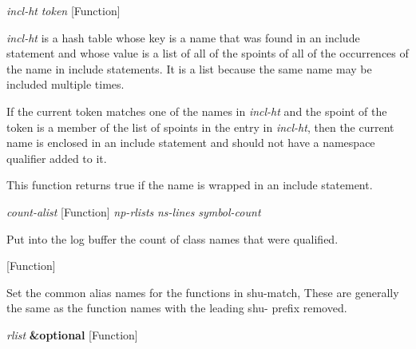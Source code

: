 \vspace{1em}
\noindent
{}
\usebox{\funcname}\emph{incl-ht} \emph{token}
 \hfill [Function]
\hspace*{\wd\funcname}

\begin{doc-string}
\emph{incl-ht} is a hash table whose key is a name that was found in an include
statement and whose value is a list of all of the spoints of all of the
occurrences of the name in include statements.  It is a list because the same
name may be included multiple times.

If the current token matches one of the names in \emph{incl-ht} and the spoint of the
token is a member of the list of spoints in the entry in \emph{incl-ht}, then the
current name is enclosed in an include statement and should not have a namespace
qualifier added to it.

This function returns true if the name is wrapped in an include statement.
\end{doc-string}

\vspace{1em}
\noindent
{}
\usebox{\funcname}\emph{count-alist}
 \hfill [Function]
\hspace*{\wd\funcname}\emph{np-rlists} \emph{ns-lines}
\hspace*{\wd\funcname}\emph{symbol-count}
\hspace*{\wd\funcname}

\begin{doc-string}
Put into the log buffer the count of class names that were qualified.
\end{doc-string}

\vspace{1em}
\noindent
{}
\usebox{\funcname}
 \hfill [Function]

\begin{doc-string}
Set the common alias names for the functions in shu-match,
These are generally the same as the function names with the leading
shu- prefix removed.
\end{doc-string}

\vspace{1em}
\noindent
{}
\usebox{\funcname}\emph{rlist} \textbf{\&optional}
 \hfill [Function]
\hspace*{\wd\funcname}

